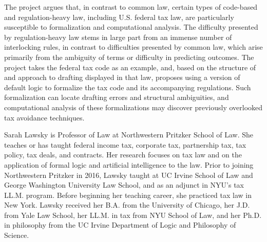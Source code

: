 The project argues that, in contrast to common law, certain types
of code-based and regulation-heavy law, including U.S. federal tax
law, are particularly susceptible to formalization and computational
analysis. The difficulty presented by regulation-heavy law stems in
large part from an immense number of interlocking rules, in contrast
to difficulties presented by common law, which arise primarily from
the ambiguity of terms or difficulty in predicting outcomes. The
project takes the federal tax code as an example, and, based on the
structure of and approach to drafting displayed in that law, proposes
using a version of default logic to formalize the tax code and its
accompanying regulations. Such formalization can locate drafting
errors and structural ambiguities, and computational analysis of
these formalizations may discover previously overlooked tax avoidance
techniques.

\bio
Sarah Lawsky is Professor of Law at Northwestern Pritzker School of Law. She
teaches or has taught federal income tax, corporate tax, partnership tax, tax
policy, tax deals, and contracts. Her research focuses on tax law and on the
application of formal logic and artificial intelligence to the law.
%
Prior to joining Northwestern Pritzker in 2016, Lawsky taught at UC Irvine
School of Law and George Washington University Law School, and as an adjunct in
NYU’s tax LL.M. program. Before beginning her teaching career, she practiced tax
law in New York.
%
Lawsky received her B.A. from the University of Chicago, her J.D. from Yale Law
School, her LL.M. in tax from NYU School of Law, and her Ph.D. in philosophy
from the UC Irvine Department of Logic and Philosophy of Science.

\newpage
